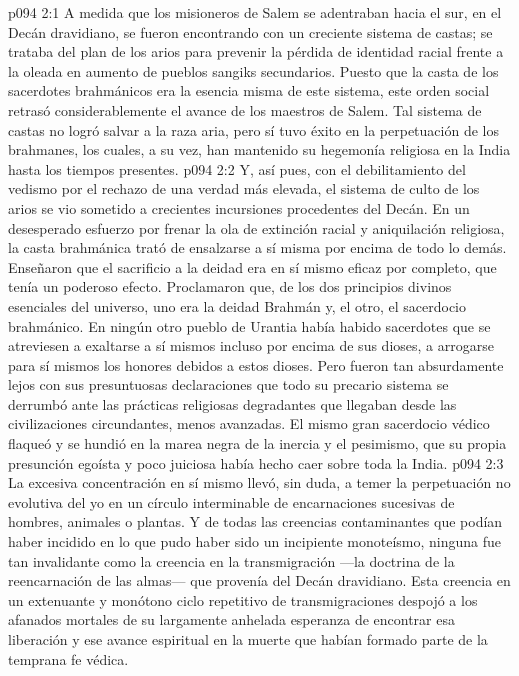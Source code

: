 \vs p094 2:1 A medida que los misioneros de Salem se adentraban hacia el sur, en el Decán dravidiano, se fueron encontrando con un creciente sistema de castas; se trataba del plan de los arios para prevenir la pérdida de identidad racial frente a la oleada en aumento de pueblos sangiks secundarios. Puesto que la casta de los sacerdotes brahmánicos era la esencia misma de este sistema, este orden social retrasó considerablemente el avance de los maestros de Salem. Tal sistema de castas no logró salvar a la raza aria, pero sí tuvo éxito en la perpetuación de los brahmanes, los cuales, a su vez, han mantenido su hegemonía religiosa en la India hasta los tiempos presentes.
\vs p094 2:2 Y, así pues, con el debilitamiento del vedismo por el rechazo de una verdad más elevada, el sistema de culto de los arios se vio sometido a crecientes incursiones procedentes del Decán. En un desesperado esfuerzo por frenar la ola de extinción racial y aniquilación religiosa, la casta brahmánica trató de ensalzarse a sí misma por encima de todo lo demás. Enseñaron que el sacrificio a la deidad era en sí mismo eficaz por completo, que tenía un poderoso efecto. Proclamaron que, de los dos principios divinos esenciales del universo, uno era la deidad Brahmán y, el otro, el sacerdocio brahmánico. En ningún otro pueblo de Urantia había habido sacerdotes que se atreviesen a exaltarse a sí mismos incluso por encima de sus dioses, a arrogarse para sí mismos los honores debidos a estos dioses. Pero fueron tan absurdamente lejos con sus presuntuosas declaraciones que todo su precario sistema se derrumbó ante las prácticas religiosas degradantes que llegaban desde las civilizaciones circundantes, menos avanzadas. El mismo gran sacerdocio védico flaqueó y se hundió en la marea negra de la inercia y el pesimismo, que su propia presunción egoísta y poco juiciosa había hecho caer sobre toda la India.
\vs p094 2:3 La excesiva concentración en sí mismo llevó, sin duda, a temer la perpetuación no evolutiva del yo en un círculo interminable de encarnaciones sucesivas de hombres, animales o plantas. Y de todas las creencias contaminantes que podían haber incidido en lo que pudo haber sido un incipiente monoteísmo, ninguna fue tan invalidante como la creencia en la transmigración ---la doctrina de la reencarnación de las almas--- que provenía del Decán dravidiano. Esta creencia en un extenuante y monótono ciclo repetitivo de transmigraciones despojó a los afanados mortales de su largamente anhelada esperanza de encontrar esa liberación y ese avance espiritual en la muerte que habían formado parte de la temprana fe védica.
